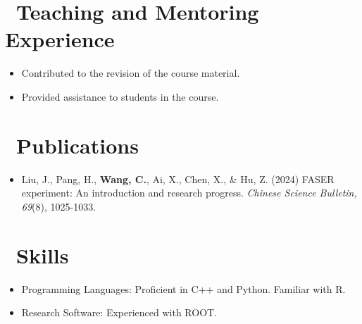 \documentclass{resume}
\begin{document}

\section{\faUsers\ Teaching and Mentoring Experience}
\begin {itemize}
  \item Contributed to the revision of the course material.
  \item Provided assistance to students in the course.
\end{itemize}


\section{\faFileText\ Publications}
\begin{itemize}
  \item Liu, J., Pang, H., \textbf{Wang, C.}, Ai, X., Chen, X., \& Hu, Z. (2024) FASER experiment: An introduction and research progress. \textit{Chinese Science Bulletin, 69}(8), 1025-1033.
\end{itemize}


\section{\faCogs\ Skills}
\begin{itemize}[parsep=0.5ex]
  \item Programming Languages: Proficient in C++ and Python. Familiar with R.
  \item Research Software: Experienced with ROOT.
\end{itemize}


%
%
\end{document}
